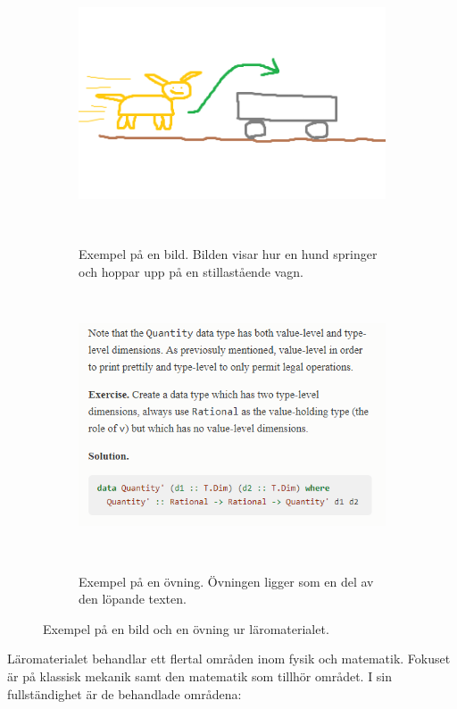 \begin{figure}[tph]
    \centering
    \begin{subfigure}[t]{0.5\textwidth}
        \centering
        \includegraphics[width=0.9\linewidth]{figure/smakprov_bild_laromaterial.png}
        \caption{Exempel på en bild. Bilden visar hur en hund springer och
                 hoppar upp på en stillastående
                 vagn.}~\label{fig:smakprov_bild_laromaterial}
    \end{subfigure}%
    ~~~
    \begin{subfigure}[t]{0.5\textwidth}
        \centering
        \includegraphics[width=0.9\linewidth]{figure/smakprov_ovning.png}
        \caption{Exempel på en övning. Övningen ligger som en del av den
                 löpande texten.}~\label{fig:smakprov_ovning}
    \end{subfigure}
    \caption{Exempel på en bild och en övning ur läromaterialet.} 
\end{figure}

Läromaterialet behandlar ett flertal områden inom fysik och matematik.
Fokuset är på klassisk mekanik samt den matematik som tillhör området. I
sin fullständighet är de behandlade områdena:

